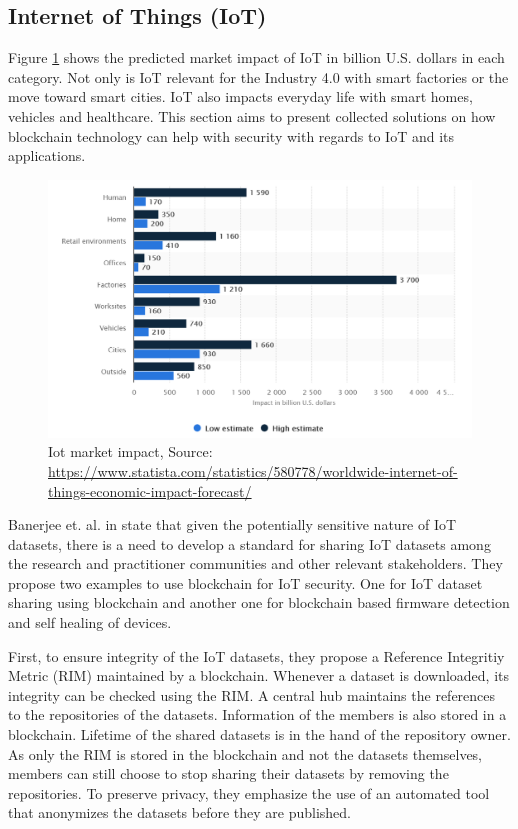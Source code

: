 \subsection{Internet of Things (IoT)}
\label{subsec:03_IoT}

Figure \ref{fig:iot_market} shows the predicted market impact of IoT in billion U.S. dollars in each category.
Not only is IoT relevant for the Industry 4.0 with smart factories or the move toward smart cities. IoT also
impacts everyday life with smart homes, vehicles and healthcare. This section aims to present collected solutions on how  blockchain technology can help with security with regards to IoT and its applications.


\begin{figure}[ht!]
  \begin{center}
    \includegraphics[scale=0.6]{Talk7/img/iot/iot_statista}
  \end{center}
  \caption{Iot market impact, Source: \protect\url{https://www.statista.com/statistics/580778/worldwide-internet-of-things-economic-impact-forecast/} }
  \label{fig:iot_market}
\end{figure}

Banerjee et. al. in \cite{Banerjee2018} state that given the potentially sensitive nature of IoT datasets,
there is a need to develop a standard for sharing IoT datasets among the research and practitioner communities
and other relevant stakeholders. They propose two examples to use blockchain for IoT security. One for IoT dataset sharing using blockchain and another one for
blockchain based firmware detection and self healing of devices.

First, to ensure integrity of the IoT datasets, they propose a Reference Integritiy Metric (RIM) maintained by a blockchain. Whenever a dataset is downloaded, its integrity can be checked using the RIM.
A central hub maintains the references to the repositories of the datasets. Information of the members is also stored in a blockchain.
Lifetime of the shared datasets is in the hand of the repository owner.
As only the RIM is stored in the blockchain and not the datasets themselves, members can still choose to stop sharing their datasets by removing the repositories.
To preserve privacy, they emphasize the use of an automated tool that anonymizes the datasets before they are published.


